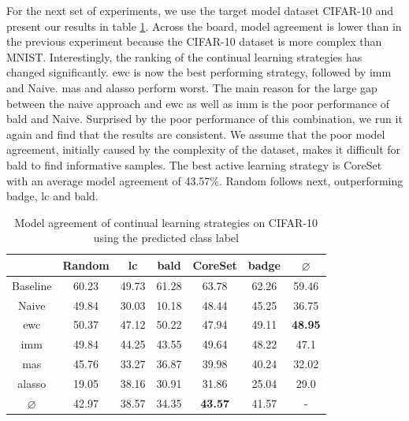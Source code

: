 For the next set of experiments, we use the target model dataset CIFAR-10 and present our results in table \ref{fig:ModelStealingCIFAR10Label}. 
Across the board, model agreement is lower than in the previous experiment because the CIFAR-10 dataset is more complex than MNIST. Interestingly, the ranking of
the continual learning strategies has changed significantly. \gls{ewc} is now the best performing strategy, followed by \gls{imm} and Naive. \gls{mas} and \gls{alasso}
perform worst. The main reason for the large gap between the naive approach and \gls{ewc} as well as \gls{imm} is the poor performance of \gls{bald} and Naive.
Surprised by the poor performance of this combination, we run it again and find that the results are consistent. We assume that the poor model agreement, initially
caused by the complexity of the dataset, makes it difficult for \gls{bald} to find informative samples. The best active learning strategy is CoreSet with an average
model agreement of 43.57\%. Random follows next, outperforming \gls{badge}, \gls{lc} and \gls{bald}. \par

\begin{table}[h]
    \centering
    \begin{tabular}{ c | c c c c c | c } 
         & Random & \gls{lc} & \gls{bald} & CoreSet & \gls{badge} & $\varnothing$\\ 
        \hline
        Baseline & 60.23 & 49.73 & 61.28 & 63.78 & 62.26 & 59.46\\
        \hline
        Naive & 49.84 & 30.03 & 10.18 & 48.44 & 45.25 & 36.75\\
        \gls{ewc} & 50.37 & 47.12 & 50.22 & 47.94 & 49.11 & \textbf{48.95} \\
        \gls{imm} & 49.84 & 44.25 & 43.55 & 49.64 & 48.22 & 47.1\\
        \gls{mas} & 45.76 & 33.27 & 36.87 & 39.98 & 40.24 & 32.02\\
        \gls{alasso} & 19.05 & 38.16 & 30.91 & 31.86 & 25.04 & 29.0\\
        \hline
        $\varnothing$ & 42.97 & 38.57 & 34.35 & \textbf{43.57} & 41.57 & -\\
    \end{tabular}
    \caption{Model agreement of continual learning strategies on CIFAR-10 using the predicted class label}
    \label{fig:ModelStealingCIFAR10Label}
\end{table}


